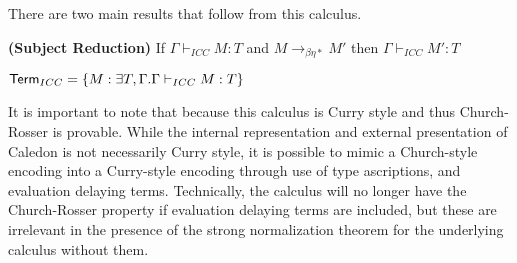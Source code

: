 There are two main results that follow from this calculus.

\begin{theorem}
\textbf{(Subject Reduction)} If $\Gamma \vdash_{ICC} M : T$ and $M \rightarrow_{\beta\eta*} M'$ then $\Gamma \vdash_{ICC} M' : T$
\end{theorem}

\begin{definition}
$ \mathsf{Term}_{ICC}  = \{ M : \exists T,\Gamma . \Gamma \vdash_{ICC} M : T \}$
\end{definition}

It is important to note that because this calculus is Curry style and thus Church-Rosser is provable.  
While the internal representation and external presentation of Caledon is not necessarily Curry style, 
it is possible to mimic a Church-style encoding into a Curry-style encoding through use of type ascriptions,
and evaluation delaying terms.  Technically, the calculus will no longer have the Church-Rosser property if 
evaluation delaying terms are included, but these are irrelevant in the presence of the strong normalization theorem
for the underlying calculus without them.

